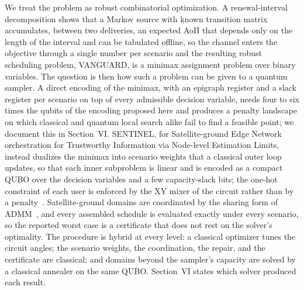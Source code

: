 We treat the problem as robust combinatorial optimization. A renewal-interval decomposition shows that a Markov source
with known transition matrix accumulates, between two deliveries, an expected AoII that depends only on the length of
the interval and can be tabulated offline, so the channel enters the objective through a single number per scenario
and the resulting robust scheduling problem, VANGUARD, is a minimax assignment problem over binary variables. The
question is then how such a problem can be given to a quantum sampler. A direct encoding of the minimax, with an
epigraph register and a slack register per scenario on top of every admissible decision variable, needs four to six
times the qubits of the encoding proposed here and produces a penalty landscape on which classical and quantum local
search alike fail to find a feasible point; we document this in Section~VI. SENTINEL, for Satellite-ground Edge
Network orchestration for Trustworthy Information via Node-level Estimation Limits, instead dualizes the minimax into
scenario weights that a classical outer loop updates, so that each inner subproblem is linear and is encoded as a
compact QUBO over the decision variables and a few capacity-slack bits; the one-hot constraint of each user is
enforced by the XY mixer of the circuit rather than by a penalty~\cite{Hadfield2019}. Satellite-ground domains are
coordinated by the sharing form of ADMM~\cite{Boyd2011}, and every assembled schedule is evaluated exactly under
every scenario, so the reported worst case is a certificate that does not rest on the solver's optimality. The
procedure is hybrid at every level: a classical optimizer tunes the circuit angles; the scenario weights, the
coordination, the repair, and the certificate are classical; and domains beyond the sampler's capacity are solved by
a classical annealer on the same QUBO. Section~VI states which solver produced each result.

